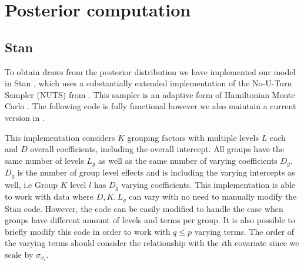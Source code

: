 \section{Posterior computation}
\label{section:appendixB}

\subsection{Stan}

To obtain draws from the posterior distribution we have implemented our model in Stan  \citep{StanJSS, stan2022}, which uses a substantially extended implementation of the No-U-Turn Sampler (NUTS) from \cite{nuts}. This sampler is an adaptive form of Hamiltonian Monte Carlo \citep{handbookmcmc}. The following code is fully functional however we also maintain a current version in \myosfresults .

This implementation considers $K$ grouping factors with multiple levels $L$ each and $D$ overall coefficients, including the overall intercept. All groups have the same number of levels $L_g$ as well as the same number of varying coefficients $D_g$. $D_g$ is the number of group level effects and is including the varying intercepts as well, i.e Group $K$ level $l$ has $D_g$ varying coefficients. This implementation is able to work with data where $D, K, L_g$ can vary with no need to manually modify the Stan code. However, the code can be easily modified to handle the case when groups have different amount of levels and terms per group. It is also possible to briefly modify this code in order to work with $q \leq p$ varying terms. The order of the varying terms should consider the relationship with the $i$th covariate since we scale by $\sigma_{x_i}$.

